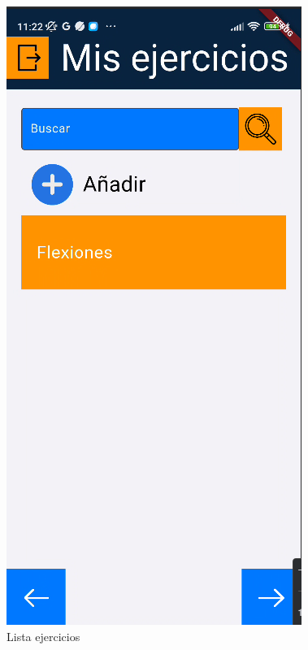 \begin{figure}[H]
   \centering
    \includegraphics[width=\textwidth]{pantallas/listaEjercicios.png}
    \caption{Lista ejercicios}
    \label{fig:ListaEjer}
\end{figure}


